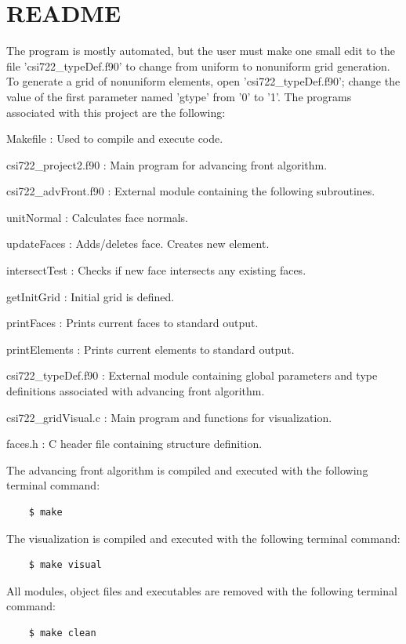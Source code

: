 \documentclass[11pt]{article}
\begin{document}
\pagebreak
\appendix
\appendixpage

\section{README}\label{app_readme}
The program is mostly automated, but the user must make one small edit to the file 'csi722\_typeDef.f90' to change from uniform to nonuniform grid generation.  To generate a grid of nonuniform elements, open 'csi722\_typeDef.f90'; change the value of the first parameter named 'gtype' from  '0' to '1'.  The programs associated with this project are the following:
\beenum
\item Makefile : Used to compile and execute code.
\item csi722\_project2.f90 : Main program for advancing front algorithm.
\item csi722\_advFront.f90 : External module containing the following subroutines.
\beenum
\item unitNormal : Calculates face normals.
\item updateFaces : Adds/deletes face. Creates new element.
\item intersectTest : Checks if new face intersects any existing faces.
\item getInitGrid : Initial grid is defined.
\item printFaces : Prints current faces to standard output.
\item printElements : Prints current elements to standard output.
\ebenum
\item csi722\_typeDef.f90 : External module containing global parameters and type definitions associated with advancing front algorithm. 
\item csi722\_gridVisual.c : Main program and functions for visualization.
\item faces.h : C header file containing structure definition.
\ebenum

\noindent The advancing front algorithm is compiled and executed with the following terminal command:
\begin{verbatim}
    $ make
\end{verbatim}
The visualization is compiled and executed with the following terminal command:
\begin{verbatim}
    $ make visual
\end{verbatim}
All modules, object files and executables are removed with the following terminal command:
\begin{verbatim}
    $ make clean
\end{verbatim}

\end{document}
